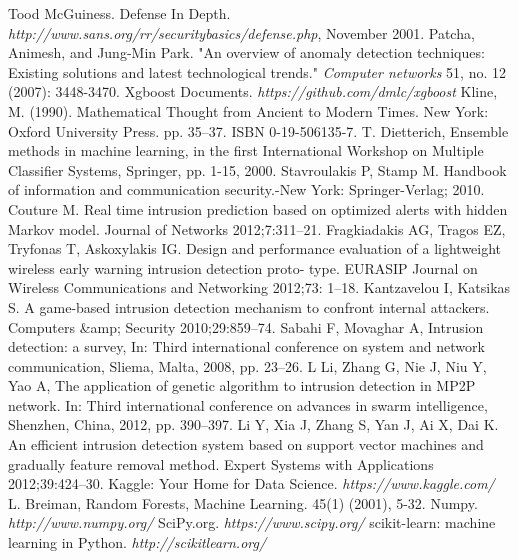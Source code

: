 \pagestyle{plain}
\renewcommand{\bibname}{\Large{TÀI LIỆU THAM KHẢO}}
\begin{thebibliography}{99}
 Tood McGuiness. Defense In Depth. \textit{http://www.sans.org/rr/securitybasics/defense.php}, November 2001.
 Patcha, Animesh, and Jung-Min Park. "An overview of anomaly detection techniques: Existing solutions and latest technological trends." \textit{Computer networks} 51, no. 12 (2007): 3448-3470.
 Xgboost Documents. \textit{https://github.com/dmlc/xgboost}
  Kline, M. (1990). Mathematical Thought from Ancient to Modern Times. New York: Oxford University Press. pp. 35–37. ISBN 0-19-506135-7.
 T. Dietterich, Ensemble methods in machine learning, in the first International Workshop on Multiple Classifier Systems, Springer, pp. 1-15, 2000.
 Stavroulakis P, Stamp M. Handbook of information and communication security.-New York: Springer-Verlag; 2010.
 Couture M. Real time intrusion prediction based on optimized alerts with hidden Markov model. Journal of Networks 2012;7:311–21.
 Fragkiadakis AG, Tragos EZ, Tryfonas T, Askoxylakis IG. Design and performance evaluation of a lightweight wireless early warning intrusion detection proto- type. EURASIP Journal on Wireless Communications and Networking 2012;73: 1–18.
 Kantzavelou I, Katsikas S. A game-based intrusion detection mechanism to confront internal attackers. Computers &amp; Security 2010;29:859–74.
 Sabahi F, Movaghar A, Intrusion detection: a survey, In: Third international conference on system and network communication, Sliema, Malta, 2008, pp. 23–26.
L Li, Zhang G, Nie J, Niu Y, Yao A, The application of genetic algorithm to intrusion detection in MP2P network. In: Third international conference on advances in swarm intelligence, Shenzhen, China, 2012, pp. 390–397.
 Li Y, Xia J, Zhang S, Yan J, Ai X, Dai K. An efficient intrusion detection system based on support vector machines and gradually feature removal method. Expert Systems with Applications 2012;39:424–30.
 Kaggle: Your Home for Data Science. \textit{https://www.kaggle.com/}
 L. Breiman, Random Forests, Machine Learning. 45(1) (2001), 5-32.
 Numpy. \textit{http://www.numpy.org/}
 SciPy.org. \textit{https://www.scipy.org/}
 scikit-learn: machine learning in Python. \textit{http://scikit\-learn.org/}

\end{thebibliography}
